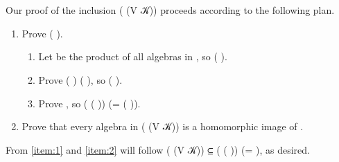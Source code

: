 \begin{code}
\AgdaSpace{}%
\AgdaSpace{}%
\AgdaSpace{}%
\AgdaSpace{}%
\AgdaSymbol{\{}\AgdaSpace{}%
\AgdaSymbol{=}\AgdaSpace{}%
\AgdaSymbol{\}}\AgdaSpace{}%
\AgdaSymbol{(}\AgdaSpace{}%
\AgdaSymbol{(}\AgdaSpace{}%
\AgdaSpace{}%
\AgdaSpace{}%
\AgdaSymbol{))}\<%
\\
%
\>[1]\AgdaSpace{}%
\AgdaSymbol{\{}\AgdaSpace{}%
\AgdaSymbol{=}\AgdaSpace{}%
\AgdaSymbol{\}}\AgdaSpace{}%
\AgdaSpace{}%
\AgdaSymbol{\{}\AgdaSymbol{\}}\AgdaSpace{}%
\AgdaSymbol{\{}\AgdaSymbol{\}}\AgdaSpace{}%
\AgdaSpace{}%
\AgdaSpace{}%
\AgdaSymbol{=}\AgdaSpace{}%
\AgdaSpace{}%
\AgdaSpace{}%
\AgdaSpace{}%
\<%
\\
\>[0]\<%
\end{code}

\noindent Our proof of the inclusion  ( (V 𝒦)) 
  proceeds according to the following plan.

\begin{enumerate}
\item \label{item:1} Prove    ( ).
\begin{enumerate}
\item \label{item:1.1} Let  be the product of all algebras in  , so    ( ).
\item \label{item:1.2} Prove  ( )   ( ), so    ( ).
\item \label{item:1.3} Prove   , so    ( ( )) (=  ( )).
\end{enumerate}
\item \label{item:2} Prove that every algebra in  ( (V 𝒦)) is a homomorphic image of
.
\end{enumerate}
From \ref{item:1} and \ref{item:2} will follow  ( (V 𝒦))
⊆  ( ( )) (=  ), as desired.

